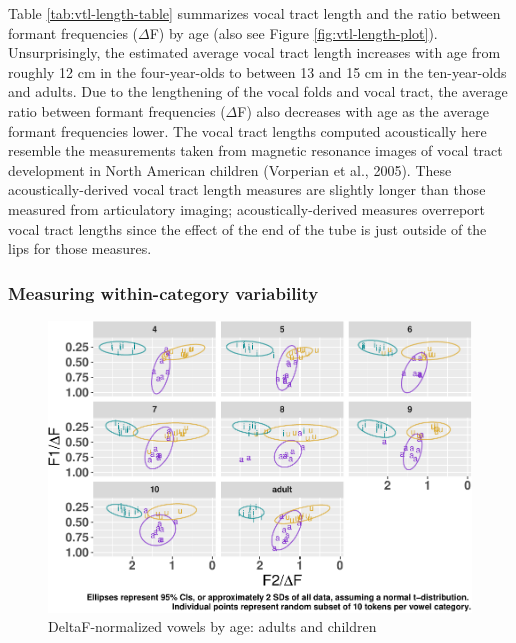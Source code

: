 \documentclass[
]{article}
\begin{document}
Table \ref{tab:vtl-length-table} summarizes vocal tract length and the ratio between formant frequencies (\(\Delta\)F) by age (also see Figure \ref{fig:vtl-length-plot}). Unsurprisingly, the estimated average vocal tract length increases with age from roughly 12 cm in the four-year-olds to between 13 and 15 cm in the ten-year-olds and adults. Due to the lengthening of the vocal folds and vocal tract, the average ratio between formant frequencies (\(\Delta\)F) also decreases with age as the average formant frequencies lower. The vocal tract lengths computed acoustically here resemble the measurements taken from magnetic resonance images of vocal tract development in North American children (Vorperian et al., 2005). These acoustically-derived vocal tract length measures are slightly longer than those measured from articulatory imaging; acoustically-derived measures overreport vocal tract lengths since the effect of the end of the tube is just outside of the lips for those measures.

\hypertarget{measuring-within-category-variability}{%
\subsubsection{Measuring within-category variability}\label{measuring-within-category-variability}}

\begin{figure}
\centering
\includegraphics{3_vtl_results_files/figure-latex/plot-raw-deltaf-data-1.pdf}
\caption{\label{fig:plot-raw-deltaf-data}DeltaF-normalized vowels by age: adults and children}
\end{figure}
\end{document}
